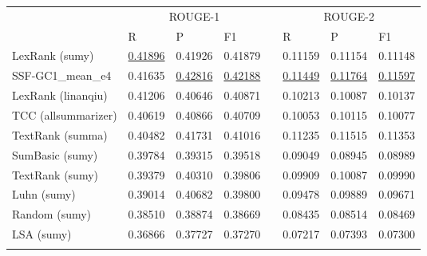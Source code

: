 \begin{tabular}{llllllll}
\noalign{\smallskip}\hline\noalign{\smallskip}

\multirow{2}{*}{Peer} & \multicolumn{3}{c}{ROUGE-1}  &&  \multicolumn{3}{c}{ROUGE-2}  \\
\cline{2-4} \cline{6-8}\noalign{\smallskip}
& R & P & F1 && R & P & F1 \\

\noalign{\smallskip}\hline\noalign{\smallskip}

LexRank (sumy) & \underline{0.41896} & 0.41926 & 0.41879 && 0.11159 & 0.11154 & 0.11148 \\
SSF-GC1\_mean\_e4 &  0.41635  & \underline{0.42816}  & \underline{0.42188}  && \underline{0.11449}  & \underline{0.11764}  & \underline{0.11597}\\
LexRank (linanqiu) & 0.41206 & 0.40646 & 0.40871 && 0.10213 & 0.10087 & 0.10137 \\
TCC (allsummarizer) & 0.40619 & 0.40866 & 0.40709 && 0.10053 & 0.10115 & 0.10077 \\
TextRank (summa) & 0.40482 & 0.41731 & 0.41016 && 0.11235 & 0.11515 & 0.11353 \\
SumBasic (sumy) & 0.39784 & 0.39315 & 0.39518 && 0.09049 & 0.08945 & 0.08989 \\
TextRank (sumy) & 0.39379 & 0.40310 & 0.39806 && 0.09909 & 0.10087 & 0.09990 \\
Luhn (sumy) & 0.39014 & 0.40682 & 0.39800 && 0.09478 & 0.09889 & 0.09671 \\
Random (sumy) & 0.38510 & 0.38874 & 0.38669 && 0.08435 & 0.08514 & 0.08469 \\
LSA (sumy) & 0.36866 & 0.37727 & 0.37270 && 0.07217 & 0.07393 & 0.07300 \\
\noalign{\smallskip}\hline
\end{tabular} 
